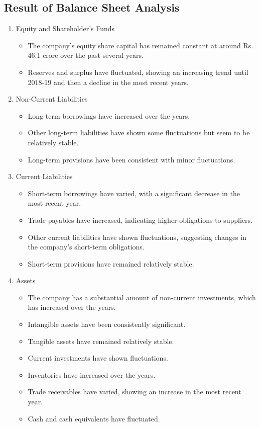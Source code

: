 \subsection{Result of Balance Sheet Analysis}
\begin{enumerate}
  

\item  Equity and Shareholder's Funds 
\begin{itemize}
  \item The company's equity share capital has remained constant at around Rs. 46.1 crore over the past several years.
  \item Reserves and surplus have fluctuated, showing an increasing trend until 2018-19 and then a decline in the most recent years.
\end{itemize}

\item  Non-Current Liabilities 
\begin{itemize}
  \item Long-term borrowings have increased over the years.
  \item Other long-term liabilities have shown some fluctuations but seem to be relatively stable.
  \item Long-term provisions have been consistent with minor fluctuations.
\end{itemize}

\item Current Liabilities 
\begin{itemize}
  \item Short-term borrowings have varied, with a significant decrease in the most recent year.
  \item Trade payables have increased, indicating higher obligations to suppliers.
  \item Other current liabilities have shown fluctuations, suggesting changes in the company's short-term obligations.
  \item Short-term provisions have remained relatively stable.
\end{itemize}

\item Assets 
\begin{itemize}
  \item The company has a substantial amount of non-current investments, which has increased over the years.
  \item Intangible assets have been consistently significant.
  \item Tangible assets have remained relatively stable.
  \item Current investments have shown fluctuations.
  \item Inventories have increased over the years.
  \item Trade receivables have varied, showing an increase in the most recent year.
  \item Cash and cash equivalents have fluctuated.
\end{itemize}


\end{enumerate}
